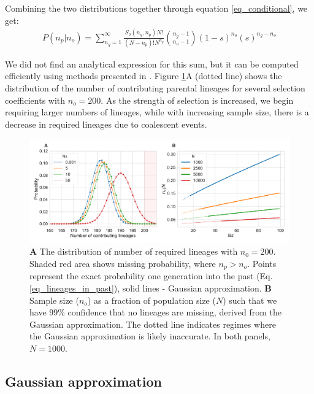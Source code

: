 \documentclass[review,nonatbib]{elsarticle}
\begin{document}
Combining the two distributions together through equation \ref{eq_conditional}, we get:
\begin{equation}
  \begin{aligned}
    \label{eq_lineages_in_past}
    P(n_p|n_o) = \sum_{n_g=1}^{\infty} \frac{S_2(n_g,n_p) N!}{(N-n_p)! N^{n_g}} \binom{n_g-1}{n_o-1}(1-s)^{n_o}(s)^{n_g-n_o}
  \end{aligned}
\end{equation}

We did not find an analytical expression for this sum, but it can be computed
efficiently using methods presented in \citep{ONeill2019}. Figure \ref{fig_combined}A (dotted line) shows
the distribution of the number of contributing parental lineages for several selection coefficients
with $n_o=200$.
As the strength of selection
is increased, we begin requiring larger numbers of lineages, while with increasing sample size,
there is a decrease in required lineages due to coalescent events.

\begin{figure}
  \centering
  \includegraphics[width=\textwidth]{fig/combined.pdf}
  \caption{\textbf{A} The distribution of number of required lineages with $n_0=200$. Shaded
    red area shows missing probability, where $n_p > n_o$. Points represent the exact probability one
    generation into the past (Eq. \ref{eq_lineages_in_past}), solid lines - Gaussian approximation.
     \textbf{B} Sample size ($n_o$) as a fraction of population size ($N$)
    such that we have $99\%$ confidence that no lineages are missing, derived from the Gaussian
    approximation. The dotted line indicates regimes where the Gaussian approximation is likely inaccurate.
     In both panels, $N=1000$.}
  \label{fig_combined}
\end{figure}

\subsection{Gaussian approximation}
\label{subsec_gaussian}
\end{document}
